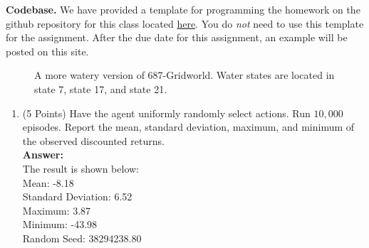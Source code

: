 \documentclass[]{article}
\begin{document}
\textbf{Codebase.} We have provided a template for programming the homework on the github repository for this class located  \href{https://github.com/bmetevier/rl-framework-687-public}{here}. You do \emph{not} need to use this template for the assignment. After the due date for this assignment, an example will be posted on this site. 

\begin{figure}[h!!!]
    \caption{A more watery version of 687-Gridworld. Water states are located in state 7, state 17, and state 21.}
    \label{fig: watery gridworld}
\end{figure}

\begin{enumerate}[label=\Alph*]
    \item (5 Points) Have the agent uniformly randomly select actions. Run $10,\!000$ episodes. Report the mean, standard deviation, maximum, and minimum of the observed discounted returns. \\
    \textbf{Answer: }\\
    The result is shown below:\\
        Mean: -8.18\\
        Standard Deviation: 6.52\\
        Maximum: 3.87\\
        Minimum: -43.98\\
        Random Seed: 38294238.80
    

\end{enumerate}
\end{document}
